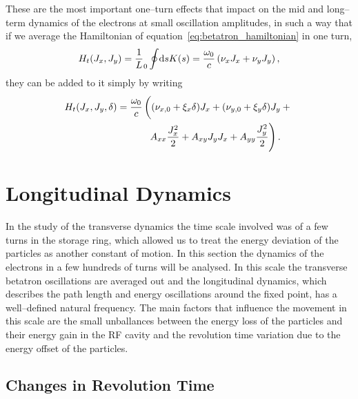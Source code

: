     These are the most important one--turn effects that impact on the mid and long--term dynamics of the electrons at small oscillation amplitudes, in such a way that if we average the Hamiltonian of equation~\eqref{eq:betatron_hamiltonian} in one turn,
    \begin{align}
        H_t(J_x, J_y) = \frac1L_0\oint\!\text{d}s K(s) = \frac{\omega_0}{c}\left(\nu_xJ_x + \nu_yJ_y\right),
    \end{align}
    they can be added to it simply by writing
    \begin{align}\label{eq:average_transverse_hamiltonian}\nonumber
        H_t(J_x, J_y, \delta) = \frac{\omega_0}{c}
                                &\left(
                                    (\nu_{x,0} + \xi_x \delta) J_x +
                                    (\nu_{y,0} + \xi_y \delta) J_y +
                                \vphantom{\frac{1_1^2}{2}}\right.\\ &\left.
                              \,\,\,A_{xx} \frac{J_x^2}{2} + A_{xy} J_yJ_x +
                                    A_{yy} \frac{J_y^2}{2}
                                \right).
    \end{align}

\section{Longitudinal Dynamics}

    In the study of the transverse dynamics the time scale involved was of a few turns in the storage ring, which allowed us to treat the energy deviation of the particles as another constant of motion. In this section the dynamics of the electrons in a few hundreds of turns will be analysed. In this scale the transverse betatron oscillations are averaged out and the longitudinal dynamics, which describes the path length and energy oscillations around the fixed point, has a well--defined natural frequency. The main factors that influence the movement in this scale are the small unballances between the energy loss of the particles and their energy gain in the RF cavity and the revolution time variation due to the energy offset of the particles.

\subsection{Changes in Revolution Time}\label{sec:longitudinal_deviations}

